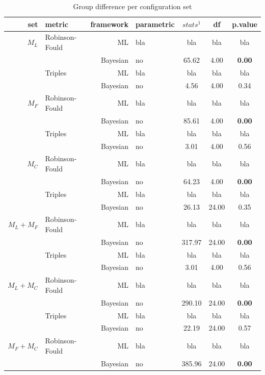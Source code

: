 \documentclass[12pt,letterpaper]{article}
\begin{document}
\begin{table}
\caption{Group difference per configuration set}
\centering
\begin{tabular}{rlrlccc}
    \hline
    set & metric & framework & parametric & $stats^1$ & df & p.value \\
    \hline
    $M_L$ & Robinson-Fould & ML & bla & bla & bla & bla \\
          &                & Bayesian & no & 65.62 & 4.00 & \textbf{0.00} \\
          & Triples & ML & bla & bla & bla & bla \\
          &         & Bayesian & no & 4.56 & 4.00 & 0.34 \\
    $M_F$ & Robinson-Fould & ML & bla & bla & bla & bla \\
          &                & Bayesian & no & 85.61 & 4.00 & \textbf{0.00} \\
          & Triples & ML & bla & bla & bla & bla \\
          &         & Bayesian & no & 3.01 & 4.00 & 0.56 \\ 
    $M_C$ & Robinson-Fould & ML & bla & bla & bla & bla \\
          &                & Bayesian & no & 64.23 & 4.00 & \textbf{0.00} \\
          & Triples & ML & bla & bla & bla & bla \\
          &         & Bayesian & no & 26.13 & 24.00 & 0.35 \\
    $M_L+M_F$ & Robinson-Fould & ML & bla & bla & bla & bla \\
              &                & Bayesian & no & 317.97 & 24.00 & \textbf{0.00} \\
              & Triples & ML & bla & bla & bla & bla \\
              &         & Bayesian & no & 3.01 & 4.00 & 0.56 \\ 
    $M_L+M_C$ & Robinson-Fould & ML & bla & bla & bla & bla \\
              &                & Bayesian & no & 290.10 & 24.00 & \textbf{0.00} \\
              & Triples & ML & bla & bla & bla & bla \\
              &         & Bayesian & no & 22.19 & 24.00 & 0.57 \\ 
    $M_F+M_C$ & Robinson-Fould & ML & bla & bla & bla & bla \\
              &                & Bayesian & no & 385.96 & 24.00 & \textbf{0.00} \\

\end{tabular}
\end{table}
\end{document}
